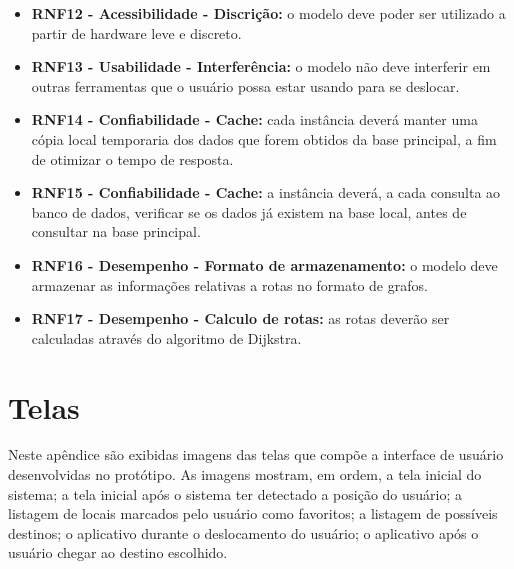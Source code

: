 \documentclass[twoside,english,brazilian]{UNISINOSartigo}
\begin{document}
\begin{itemize}
 	\item \textbf{RNF12 - Acessibilidade - Discrição:} o modelo deve poder ser utilizado a partir de hardware leve e discreto.

 	\item \textbf{RNF13 - Usabilidade - Interferência:} o modelo não deve interferir em outras ferramentas que o usuário possa estar usando para se deslocar.

 	\item \textbf{RNF14 - Confiabilidade - Cache:} cada instância deverá manter uma cópia local temporaria dos dados que forem obtidos da base principal, a fim de otimizar o tempo de resposta.

 	\item \textbf{RNF15 - Confiabilidade - Cache:} a instância deverá, a cada consulta ao banco de dados, verificar se os dados já existem na base local, antes de consultar na base principal.

 	\item \textbf{RNF16 - Desempenho - Formato de armazenamento:} o modelo deve armazenar as informações relativas a rotas no formato de grafos.

 	\item \textbf{RNF17 - Desempenho - Calculo de rotas:} as rotas deverão ser calculadas através do algoritmo de Dijkstra.
 \end{itemize}


 \section{Telas}
 Neste apêndice são exibidas imagens das telas que compõe a interface de usuário desenvolvidas no protótipo. As imagens mostram, em ordem, a tela inicial do sistema; a tela inicial após o sistema ter detectado a posição do usuário; a listagem de locais marcados pelo usuário como favoritos; a listagem de possíveis destinos; o aplicativo durante o deslocamento do usuário; o aplicativo após o usuário chegar ao destino escolhido.
\end{document}
